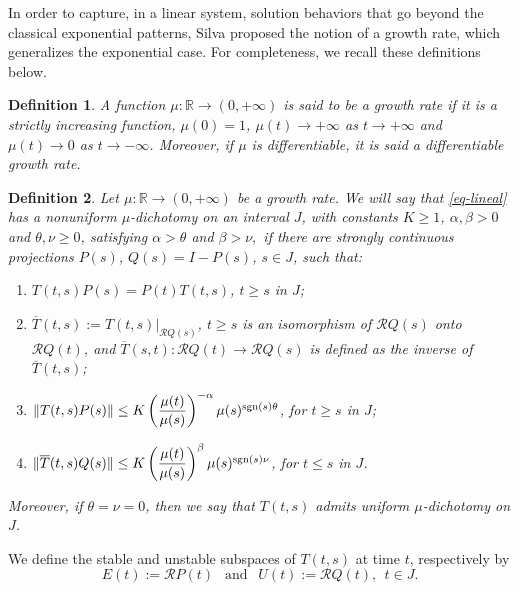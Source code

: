 \documentclass[9pt]{amsart}
\newtheorem{definition}{Definition}
\numberwithin{equation}{section}
\numberwithin{lemma}{section}
\begin{document}
 In order to capture, in a linear system, solution behaviors that go beyond the classical exponential patterns, Silva \cite{Silva} proposed the notion of a growth rate, which generalizes the exponential case. For completeness, we recall these definitions below.


 
 \begin{definition}
     A function $\mu:\mathbb{R}\to(0,+\infty)$ is said to be a growth rate if it is a strictly increasing function, $\mu(0)=1$, $\mu(t)\to+\infty$ as $t\to+\infty$ and $\mu(t)\to0$ as $t\to-\infty$. Moreover, if $\mu$ is differentiable, it is said a differentiable growth rate.
 \end{definition}
 
\begin{definition}\label{mu-D}
Let $\mu:\mathbb{R}\to (0,+\infty)$ be a growth rate. We will say that  \eqref{eq-lineal} has a nonuniform $\mu$-dichotomy on an  interval $J$, with constants $K\geq 1$, $\alpha, \beta>0$ and $\theta, \nu\geq 0$, satisfying $\alpha>\theta$ and $\beta>\nu,$  if there are  strongly continuous projections $P(s)$, $Q(s)=I-P(s)$, $s\in J$, such that:

 \begin{enumerate}
  \item[(i)] $T(t,s)P(s)=P(t)T(t,s)$, $t\geq s$ in $J$;
  \item[(ii)] $\overline{T}(t,s):=T(t,s)|_{\mathcal{R}Q(s)}$, $t\geq s$ is an isomorphism of $\mathcal{R}Q(s)$ onto $\mathcal{R}Q(t)$, and $\overline{T}(s,t):\mathcal{R}Q(t)\to\mathcal{R}Q(s)$ is defined as the inverse of $\overline{T}(t,s)$;
  \item[(iii)] $\|T(t,s)P(s)\|\leq K\left(\dfrac{\mu(t)}{\mu(s)}\right)^{-\alpha}\mu(s)^{\textnormal{sgn}(s)\theta}$, for  $t\geq s$ in $J$;
  \item[(iv)] $\|\overline{T}(t,s)Q(s)\|\leq K\left(\dfrac{\mu(t)}{\mu(s)}\right)^{\beta}\mu(s)^{\textnormal{sgn}(s)\nu}$, for $t\leq s$ in $J$.
\end{enumerate}
Moreover, if $\theta=\nu=0$, then we say that $T(t,s)$ admits uniform $\mu$-dichotomy on $J$.
\end{definition}

We define the stable and unstable subspaces of $T(t,s)$ at time $t$, respectively by
\begin{equation*}
E(t):=\mathcal{R}P(t) \ \ \mbox{ and } \ \ U(t):=\mathcal{R}Q(t), \ \ t\in J.
\end{equation*}
\end{document}
